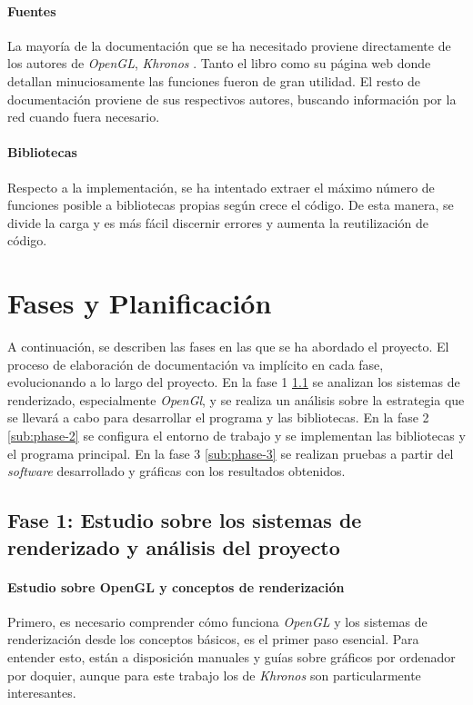 \paragraph{Fuentes} La mayoría de la documentación que se ha necesitado proviene directamente de los autores de \textit{OpenGL}, \textit{Khronos} \cite{bookOGLGuideKhronos9}. Tanto el libro como su página web donde detallan minuciosamente las funciones fueron de gran utilidad. El resto de documentación proviene de sus respectivos autores, buscando información por la red cuando fuera necesario.

\paragraph{Bibliotecas} Respecto a la implementación, se ha intentado extraer el máximo número de funciones posible a bibliotecas propias según crece el código. De esta manera, se divide la carga y es más fácil discernir errores y aumenta la reutilización de código.

\section{Fases y Planificación} \label{sec:phases}
A continuación, se describen las fases en las que se ha abordado el proyecto. El proceso de elaboración de documentación va implícito en cada fase, evolucionando a lo largo del proyecto. En la fase 1 \ref{sub:phase-1} se analizan los sistemas de renderizado, especialmente \textit{OpenGl}, y se realiza un análisis sobre la estrategia que se llevará a cabo para desarrollar el programa y las bibliotecas. En la fase 2 \ref{sub:phase-2} se configura el entorno de trabajo y se implementan las bibliotecas y el programa principal. En la fase 3 \ref{sub:phase-3} se realizan pruebas a partir del \textit{software} desarrollado y gráficas con los resultados obtenidos.

\subsection{Fase 1: Estudio sobre los sistemas de renderizado y análisis del proyecto}\label{sub:phase-1}

\paragraph{Estudio sobre OpenGL y conceptos de renderización} Primero, es necesario comprender cómo funciona \textit{OpenGL} y los sistemas de renderización desde los conceptos básicos, es el primer paso esencial. Para entender esto, están a disposición manuales y guías sobre gráficos por ordenador por doquier, aunque para este trabajo los de \textit{Khronos} son particularmente interesantes.

